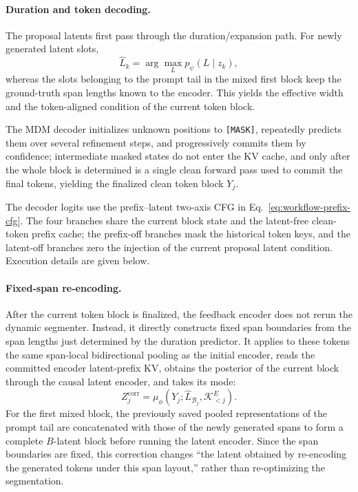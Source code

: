\paragraph{Duration and token decoding.}
The proposal latents first pass through the duration/expansion path. For newly generated latent slots,
\begin{equation}
    \widehat L_k=\arg\max_L p_\psi(L\mid z_k),
    \label{eq:app-workflow-length-infer}
\end{equation}
whereas the slots belonging to the prompt tail in the mixed first block keep the ground-truth span lengths known to the encoder. This yields the effective width and the token-aligned condition of the current token block.

The MDM decoder initializes unknown positions to \texttt{[MASK]}, repeatedly predicts them over several refinement steps, and progressively commits them by confidence; intermediate masked states do not enter the KV cache, and only after the whole block is determined is a single clean forward pass used to commit the final tokens, yielding the finalized clean token block $Y_j$.

The decoder logits use the prefix--latent two-axis CFG in Eq.~\eqref{eq:workflow-prefix-cfg}. The four branches share the current block state and the latent-free clean-token prefix cache; the prefix-off branches mask the historical token keys, and the latent-off branches zero the injection of the current proposal latent condition. Execution details are given below.

\paragraph{Fixed-span re-encoding.}
After the current token block is finalized, the feedback encoder does not rerun the dynamic segmenter. Instead, it directly constructs fixed span boundaries from the span lengths just determined by the duration predictor. It applies to these tokens the same span-local bidirectional pooling as the initial encoder, reads the committed encoder latent-prefix KV, obtains the posterior of the current block through the causal latent encoder, and takes its mode:
\begin{equation}
    Z_j^{\mathrm{corr}}
    =\mu_\phi\!\left(Y_j;
      \widehat L_{\mathcal B_j},
      \mathcal K^{E}_{<j}\right).
    \label{eq:app-workflow-corrected-latent}
\end{equation}
For the first mixed block, the previously saved pooled representations of the prompt tail are concatenated with those of the newly generated spans to form a complete $B$-latent block before running the latent encoder. Since the span boundaries are fixed, this correction changes ``the latent obtained by re-encoding the generated tokens under this span layout,'' rather than re-optimizing the segmentation.

